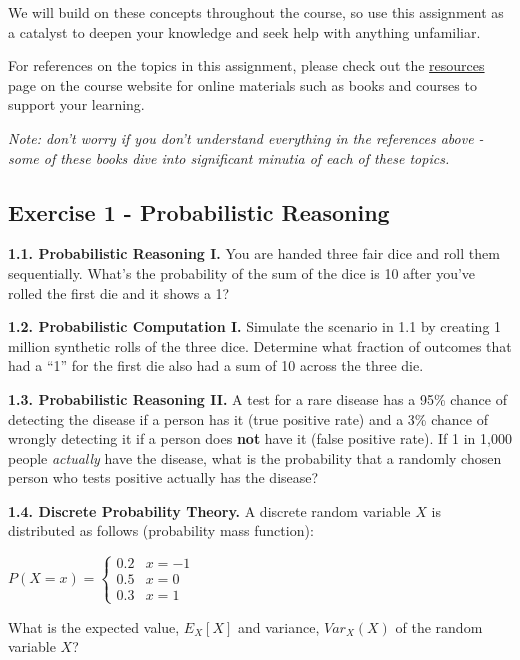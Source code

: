 \documentclass[
  letterpaper,
  DIV=11,
  numbers=noendperiod]{scrartcl}
\begin{document}
We will build on these concepts throughout the course, so use this
assignment as a catalyst to deepen your knowledge and seek help with
anything unfamiliar.

For references on the topics in this assignment, please check out the
\href{../resources.qmd\#}{resources} page on the course website for
online materials such as books and courses to support your learning.

\emph{Note: don't worry if you don't understand everything in the
references above - some of these books dive into significant minutia of
each of these topics.}

\newpage{}

\subsection{Exercise 1 - Probabilistic
Reasoning}\label{exercise-1---probabilistic-reasoning}

\textbf{1.1. Probabilistic Reasoning I.} You are handed three fair dice
and roll them sequentially. What's the probability of the sum of the
dice is 10 after you've rolled the first die and it shows a 1?

\textbf{1.2. Probabilistic Computation I.} Simulate the scenario in 1.1
by creating 1 million synthetic rolls of the three dice. Determine what
fraction of outcomes that had a ``1'' for the first die also had a sum
of 10 across the three die.

\textbf{1.3. Probabilistic Reasoning II.} A test for a rare disease has
a 95\% chance of detecting the disease if a person has it (true positive
rate) and a 3\% chance of wrongly detecting it if a person does
\textbf{not} have it (false positive rate). If 1 in 1,000 people
\emph{actually} have the disease, what is the probability that a
randomly chosen person who tests positive actually has the disease?

\textbf{1.4. Discrete Probability Theory.} A discrete random variable
\(X\) is distributed as follows (probability mass function):

\(P(X = x) = \begin{cases}
                0.2 & x = -1 \\
                0.5 & x = 0 \\
                0.3 & x = 1
            \end{cases}\)

What is the expected value, \(E_X[X]\) and variance, \(Var_X(X)\) of the
random variable \(X\)?
\end{document}
